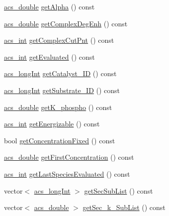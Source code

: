 \begin{DoxyCompactItemize}
\item 
\hyperlink{a00024_ab776853a005fcbf56af0424a2a4dd607}{acs\-\_\-double} \hyperlink{a00022_ada367a1f9bee0db211072929de5cae7e}{get\-Alpha} () const 
\item 
\hyperlink{a00024_ab776853a005fcbf56af0424a2a4dd607}{acs\-\_\-double} \hyperlink{a00022_a2870bc4874efda0a1a079eb2b326ecd9}{get\-Complex\-Deg\-Enh} () const 
\item 
\hyperlink{a00024_a8d277355641a098190360234e2ebde35}{acs\-\_\-int} \hyperlink{a00022_a4c87285bf983ddd5635b58ce82d02a80}{get\-Complex\-Cut\-Pnt} () const 
\item 
\hyperlink{a00024_a8d277355641a098190360234e2ebde35}{acs\-\_\-int} \hyperlink{a00022_acb08d02f3dcadd9f422d435219d1dc57}{get\-Evaluated} () const 
\item 
\hyperlink{a00024_a19319d75f02db4308bc5c0026d98cd85}{acs\-\_\-long\-Int} \hyperlink{a00022_a4be19a81a4de43016316832fdf8b5f35}{get\-Catalyst\-\_\-\-I\-D} () const 
\item 
\hyperlink{a00024_a19319d75f02db4308bc5c0026d98cd85}{acs\-\_\-long\-Int} \hyperlink{a00022_a3bc786de75d9c6235c75eeda10b01b8d}{get\-Substrate\-\_\-\-I\-D} () const 
\item 
\hyperlink{a00024_ab776853a005fcbf56af0424a2a4dd607}{acs\-\_\-double} \hyperlink{a00022_a22a114de19bb6c6d550b967797529e1d}{get\-K\-\_\-phospho} () const 
\item 
\hyperlink{a00024_a8d277355641a098190360234e2ebde35}{acs\-\_\-int} \hyperlink{a00022_ad234e523f16507008b64f2d872d9792f}{get\-Energizable} () const 
\item 
bool \hyperlink{a00022_aa2b24de5a97f1e06d359ab5b63817d98}{get\-Concentration\-Fixed} () const 
\item 
\hyperlink{a00024_ab776853a005fcbf56af0424a2a4dd607}{acs\-\_\-double} \hyperlink{a00022_a6773ef96109c27ddd4afa78b87b2fcd3}{get\-First\-Concentration} () const 
\item 
\hyperlink{a00024_a8d277355641a098190360234e2ebde35}{acs\-\_\-int} \hyperlink{a00022_ace7de26d4e33dddfa78f2c624cfb3666}{get\-Last\-Species\-Evaluated} () const 
\item 
vector$<$ \hyperlink{a00024_a19319d75f02db4308bc5c0026d98cd85}{acs\-\_\-long\-Int} $>$ \hyperlink{a00022_ada53efcec76e8f241b15fd6c76d4fb79}{get\-Sec\-Sub\-List} () const 
\item 
vector$<$ \hyperlink{a00024_ab776853a005fcbf56af0424a2a4dd607}{acs\-\_\-double} $>$ \hyperlink{a00022_a30f77a52d0c75f02f6b4c269b5cf702d}{get\-Sec\-\_\-k\-\_\-\-Sub\-List} () const 

\end{DoxyCompactItemize}
